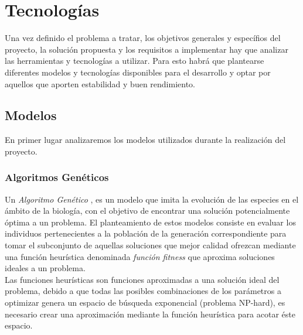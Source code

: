 
\chapter{Tecnologías}
\label{tecnologias}

    Una vez definido el problema a tratar, los objetivos generales y específios del proyecto, la solución propuesta y los requisitos a implementar hay que analizar las herramientas y tecnologías a utilizar. Para esto habrá que plantearse diferentes modelos y tecnologías disponibles para el desarrollo y optar por aquellos que aporten estabilidad y buen rendimiento.

    \section{Modelos}

        En primer lugar analizaremos los modelos utilizados durante la realización del proyecto.

        \subsection {Algoritmos Genéticos}
            Un \textit{Algoritmo Genético} \cite{GA}, es un modelo que imita la evolución de las especies en el ámbito de la biología, con el objetivo de encontrar una solución potencialmente óptima a un problema. El planteamiento de estos modelos consiste en evaluar los individuos pertenecientes a la población de la generación correspondiente para tomar el subconjunto de aquellas soluciones que mejor calidad ofrezcan mediante una función heurística denominada \textit{función fitness} que aproxima soluciones ideales a un problema.\\

            Las funciones heurísticas son funciones aproximadas a una solución ideal del problema, debido a que todas las posibles combinaciones de los parámetros a optimizar genera un espacio de búsqueda exponencial (problema NP-hard), es necesario crear una aproximación mediante la función heurística para acotar éste espacio.\\

